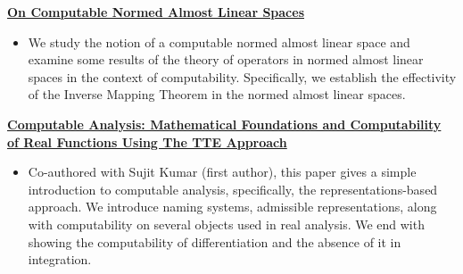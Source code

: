 {}
{\href{https://confumbit.github.io/assets/pdf/comp_nals_article.pdf}
    {\textbf{On Computable Normed Almost Linear Spaces}}}
{
    \begin{itemize}
        \item We study the notion of a computable normed almost linear space and
              examine some results of the theory of operators in normed almost linear
              spaces in the context of computability.  Specifically, we establish the
              effectivity of the Inverse Mapping Theorem in the normed almost linear
              spaces.
    \end{itemize}
}

{}
{\href{https://doi.org/10.46753/pjmpa.2026.v01i01.001}
    {\textbf{Computable Analysis: Mathematical Foundations and Computability of Real Functions Using The TTE Approach}}}
{
    \begin{itemize}
        \item Co-authored with Sujit Kumar (first author), this paper gives a
              simple introduction to computable analysis, specifically, the
              representations-based approach. We introduce naming systems,
              admissible representations, along with computability on several
              objects used in real analysis. We end with showing the
              computability of differentiation and the absence of it in
              integration.
    \end{itemize}
}
